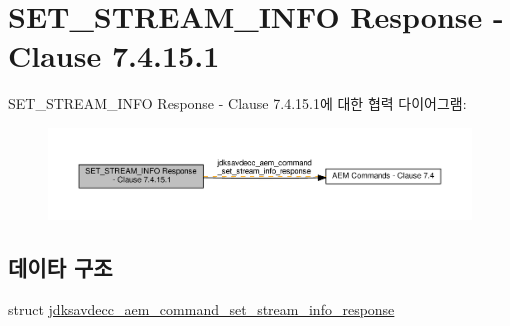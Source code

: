 \hypertarget{group__command__set__stream__info__response}{}\section{S\+E\+T\+\_\+\+S\+T\+R\+E\+A\+M\+\_\+\+I\+N\+FO Response -\/ Clause 7.4.15.1}
\label{group__command__set__stream__info__response}
S\+E\+T\+\_\+\+S\+T\+R\+E\+A\+M\+\_\+\+I\+N\+FO Response -\/ Clause 7.4.15.1에 대한 협력 다이어그램\+:
\nopagebreak
\begin{figure}[H]
\begin{center}
\leavevmode
\includegraphics[width=350pt]{group__command__set__stream__info__response}
\end{center}
\end{figure}
\subsection*{데이타 구조}
\begin{DoxyCompactItemize}
\item 
struct \hyperlink{structjdksavdecc__aem__command__set__stream__info__response}{jdksavdecc\+\_\+aem\+\_\+command\+\_\+set\+\_\+stream\+\_\+info\+\_\+response}
\end{DoxyCompactItemize}
